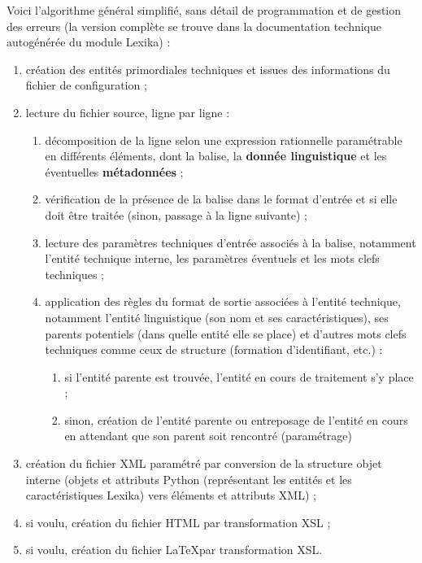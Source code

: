 \documentclass[10pt]{report}
\newcommand{\balise}[1]{\textcolor{red!80}{#1}}
\newcommand{\entité}[1]{\textcolor{blue!60!black}{#1}}
\newcommand{\caractéristique}[1]{\textcolor{green!60!black}{#1}}
\newcommand{\entitétechnique}[1]{\textcolor{blue!50!red}{#1}}
\begin{document}
Voici l’algorithme général simplifié, sans détail de programmation et de gestion des erreurs (la version complète se trouve dans la documentation technique autogénérée du module Lexika) :
\begin{enumerate}
	\item création des entités primordiales techniques et issues des informations du fichier de configuration ;
	\item lecture du fichier source, ligne par ligne :
	\begin{enumerate}
    \item décomposition de la ligne selon une expression rationnelle paramétrable en différents éléments, dont la \balise{balise}, la \textbf{donnée linguistique} et les éventuelles \textbf{métadonnées} ;
    \item vérification de la présence de la \balise{balise} dans le format d’entrée et si elle doit être traitée (sinon, passage à la ligne suivante) ;
    \item lecture des paramètres techniques d’entrée associés à la \balise{balise}, notamment l’\entitétechnique{entité technique interne}, les paramètres éventuels et les mots clefs techniques ;
    \item application des règles du format de sortie associées à l’\entitétechnique{entité technique}, notamment l’\entité{entité linguistique} (son nom et ses \caractéristique{caractéristiques}), ses \entité{parents potentiels} (dans quelle \entité{entité} elle se place) et d’autres mots clefs techniques comme ceux de structure (formation d’identifiant, etc.) :
    \begin{enumerate}
    	\item si l’\entité{entité parente} est trouvée, l’\entité{entité en cours de traitement} s’y place ;
    	\item sinon, création de l’\entité{entité parente} ou entreposage de l’\entité{entité en cours} en attendant que son \entité{parent} soit rencontré (paramétrage)
    \end{enumerate}
	\end{enumerate}
	\item création du fichier XML paramétré par conversion de la structure objet interne (objets et attributs Python (représentant les \entité{entités} et les \caractéristique{caractéristiques} Lexika) vers éléments et attributs XML) ;
	\item si voulu, création du fichier HTML par transformation XSL ;
	\item si voulu, création du fichier \LaTeX par transformation XSL.
\end{enumerate}
\end{document}
